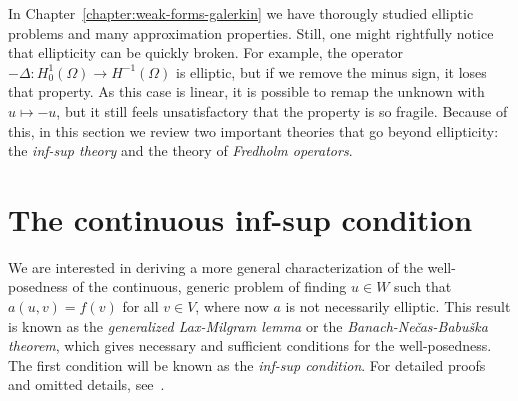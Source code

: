 In Chapter~\ref{chapter:weak-forms-galerkin} we have thorougly studied elliptic problems and many approximation properties. Still, one might rightfully notice that ellipticity can be quickly broken. For example, the operator $-\Delta: H_0^1(\Omega)\to H^{-1}(\Omega)$ is elliptic, but if we remove the minus sign, it loses that property. As this case is linear, it is possible to remap the unknown with $u\mapsto -u$, but it still feels unsatisfactory that the property is so fragile. Because of this, in this section we review two important theories that go beyond ellipticity: the \emph{inf-sup theory} and the theory of \emph{Fredholm operators}.

\section{The continuous inf-sup condition}\label{sec:inf-sup}
We are interested in deriving a more general characterization of the well-posedness of the continuous, generic problem of finding $u\in W$ such that $a(u,v)=f(v)$ for all $v\in V$, where now $a$ is not necessarily elliptic. This result is known as the \emph{generalized Lax-Milgram lemma} or the \emph{Banach-Ne\v{c}as-Babu\v{s}ka theorem}, which gives necessary and sufficient conditions for the well-posedness. The first condition will be known as the \emph{inf-sup condition}. For detailed proofs and omitted details, see~\cite{ern2004theory, chen2024infSup, gatica2014simple}. 

